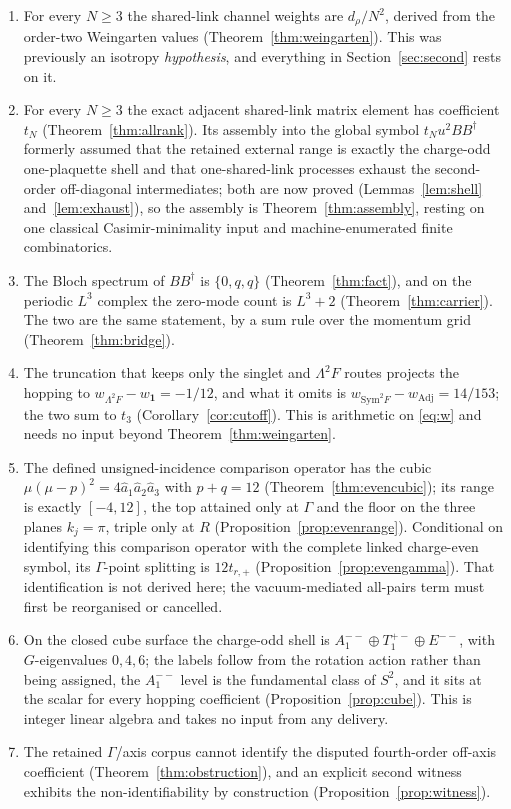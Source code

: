 \documentclass[11pt]{article}
\theoremstyle{plain}
\theoremstyle{definition}
\theoremstyle{remark}
\newcommand{\dg}{^{\dagger}}
\begin{document}
\begin{enumerate}\itemsep2pt
\item For every $N\ge3$ the shared-link channel weights are $d_\rho/N^2$,
  derived from the order-two Weingarten values
  (Theorem~\ref{thm:weingarten}). This was previously an isotropy
  \emph{hypothesis}, and everything in Section~\ref{sec:second} rests on it.
\item For every $N\ge3$ the exact adjacent shared-link matrix element has
  coefficient $t_N$ (Theorem~\ref{thm:allrank}). Its assembly into the global
  symbol $t_Nu^2BB\dg$ formerly assumed that the retained external range is
  exactly the charge-odd one-plaquette shell and that one-shared-link
  processes exhaust the second-order off-diagonal intermediates; both are
  now proved (Lemmas~\ref{lem:shell} and~\ref{lem:exhaust}), so the
  assembly is Theorem~\ref{thm:assembly}, resting on one classical
  Casimir-minimality input and machine-enumerated finite combinatorics.
\item The Bloch spectrum of $BB\dg$ is $\{0,q,q\}$ (Theorem~\ref{thm:fact}),
  and on the periodic $L^3$ complex the zero-mode count is $L^3+2$
  (Theorem~\ref{thm:carrier}). The two are the same statement, by a sum rule
  over the momentum grid (Theorem~\ref{thm:bridge}).
\item\label{item:cutoff} The truncation that keeps only the singlet and $\Lambda^2F$ routes
  projects the hopping to $w_{\Lambda^2F}-w_{\mathbf 1}=-1/12$, and what it
  omits is $w_{\mathrm{Sym}^2F}-w_{\mathrm{Adj}}=14/153$; the two sum to
  $t_3$ (Corollary~\ref{cor:cutoff}). This is arithmetic on
  \eqref{eq:w} and needs no input beyond Theorem~\ref{thm:weingarten}.
\item The defined unsigned-incidence comparison operator has the cubic
  $\mu(\mu-p)^2=4\hat a_1\hat a_2\hat a_3$ with $p+q=12$
  (Theorem~\ref{thm:evencubic}); its range is exactly $[-4,12]$, the top
  attained only at $\Gamma$ and the floor on the three planes $k_j=\pi$, triple
  only at $R$ (Proposition~\ref{prop:evenrange}). Conditional on identifying
  this comparison operator with the complete linked charge-even symbol, its
  $\Gamma$-point splitting is $12t_{r,+}$
  (Proposition~\ref{prop:evengamma}). That identification is not derived here;
  the vacuum-mediated all-pairs term must first be reorganised or cancelled.
\item On the closed cube surface the charge-odd shell is
  $A_1^{--}\oplus T_1^{+-}\oplus E^{--}$, with $G$-eigenvalues $0,4,6$; the
  labels follow from the rotation action rather than being assigned, the
  $A_1^{--}$ level is the fundamental class of $S^2$, and it sits at the scalar
  for every hopping coefficient (Proposition~\ref{prop:cube}). This is integer
  linear algebra and takes no input from any delivery.
\item The retained $\Gamma$/axis corpus cannot identify the disputed
  fourth-order off-axis coefficient (Theorem~\ref{thm:obstruction}), and an
  explicit second witness exhibits the non-identifiability by construction
  (Proposition~\ref{prop:witness}).
\end{enumerate}
\end{document}
